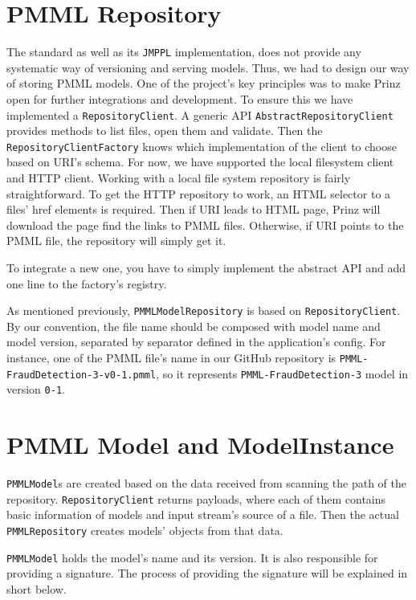 \section{PMML Repository}
\label{sec:pmml-repository}

The standard as well as its \texttt{JMPPL} implementation, does not provide any systematic way of versioning and serving models.
Thus, we had to design our way of storing PMML models. One of the project’s key principles was
to make Prinz open for further integrations and development. To ensure this we have implemented a \texttt{RepositoryClient}.
A generic API \texttt{AbstractRepositoryClient} provides methods to list files, open them and validate. Then the \texttt{RepositoryClientFactory}
knows which implementation of the client to choose based on URI’s schema. For now, we have supported the local filesystem client and HTTP client.
Working with a local file system repository is fairly straightforward. To get the HTTP repository to work, an HTML selector to a files' href elements
is required. Then if URI leads to HTML page, Prinz will download the page find the links to PMML files. Otherwise, if URI points
to the PMML file, the repository will simply get it.

To integrate a new one, you have to simply implement the abstract API and add one line to the factory’s registry.

As mentioned previously, \texttt{PMMLModelRepository} is based on \texttt{RepositoryClient}. By our convention,
the file name should be composed with model name and model version, separated by separator defined in the application’s config.
For instance, one of the PMML file's name in our GitHub repository is \texttt{PMML-FraudDetection-3-v0-1.pmml}, so it represents
\texttt{PMML-FraudDetection-3} model in version \texttt{0-1}.

\section{PMML Model and ModelInstance}

\texttt{PMMLModel}s are created based on the data received from scanning the path of the repository.
\texttt{RepositoryClient} returns payloads, where each of them contains basic information of models and input stream's source of a file.
Then the actual \texttt{PMMLRepository} creates models’ objects from that data.

\texttt{PMMLModel} holds the model’s name and its version. It is also responsible for providing a signature. The process of providing the signature will
be explained in short below.

